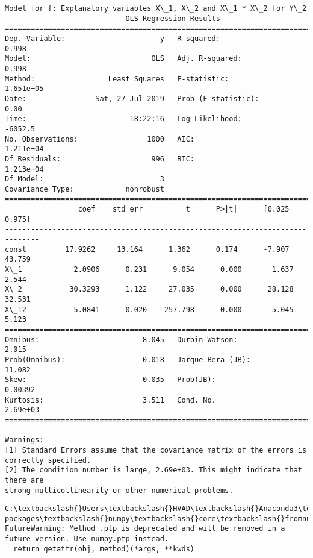 \documentclass[11pt]{article}
\begin{document}
    \begin{Verbatim}[commandchars=\\\{\}]
Model for f: Explanatory variables X\_1, X\_2 and X\_1 * X\_2 for Y\_2
                            OLS Regression Results                            
==============================================================================
Dep. Variable:                      y   R-squared:                       0.998
Model:                            OLS   Adj. R-squared:                  0.998
Method:                 Least Squares   F-statistic:                 1.651e+05
Date:                Sat, 27 Jul 2019   Prob (F-statistic):               0.00
Time:                        18:22:16   Log-Likelihood:                -6052.5
No. Observations:                1000   AIC:                         1.211e+04
Df Residuals:                     996   BIC:                         1.213e+04
Df Model:                           3                                         
Covariance Type:            nonrobust                                         
==============================================================================
                 coef    std err          t      P>|t|      [0.025      0.975]
------------------------------------------------------------------------------
const         17.9262     13.164      1.362      0.174      -7.907      43.759
X\_1            2.0906      0.231      9.054      0.000       1.637       2.544
X\_2           30.3293      1.122     27.035      0.000      28.128      32.531
X\_12           5.0841      0.020    257.798      0.000       5.045       5.123
==============================================================================
Omnibus:                        8.045   Durbin-Watson:                   2.015
Prob(Omnibus):                  0.018   Jarque-Bera (JB):               11.082
Skew:                           0.035   Prob(JB):                      0.00392
Kurtosis:                       3.511   Cond. No.                     2.69e+03
==============================================================================

Warnings:
[1] Standard Errors assume that the covariance matrix of the errors is correctly specified.
[2] The condition number is large, 2.69e+03. This might indicate that there are
strong multicollinearity or other numerical problems.

    \end{Verbatim}

    \begin{Verbatim}[commandchars=\\\{\}]
C:\textbackslash{}Users\textbackslash{}HVAD\textbackslash{}Anaconda3\textbackslash{}lib\textbackslash{}site-packages\textbackslash{}numpy\textbackslash{}core\textbackslash{}fromnumeric.py:52: FutureWarning: Method .ptp is deprecated and will be removed in a future version. Use numpy.ptp instead.
  return getattr(obj, method)(*args, **kwds)

    \end{Verbatim}
\end{document}

